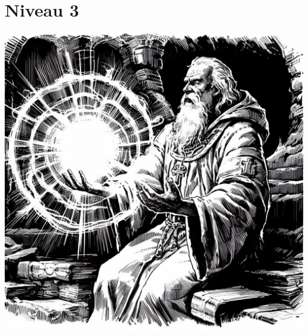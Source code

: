 \section{Niveau 3}


\vspace*{\fill}\columnbreak

\vspace*{\fill}\columnbreak


\vspace*{\fill}\columnbreak


\includegraphics[width=\columnwidth]{img/lumiere.jpg}

\newpage
